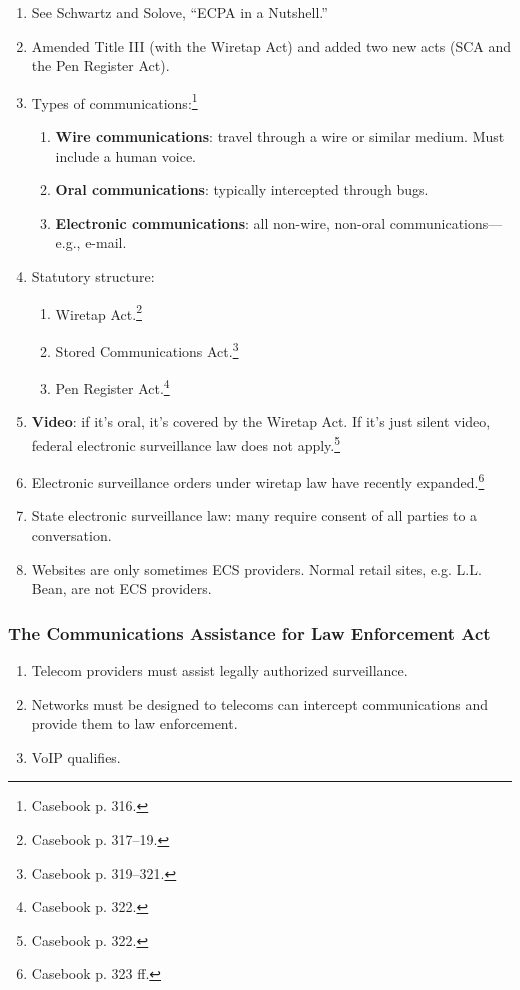 \begin{enumerate}
    \item See Schwartz and Solove, ``ECPA in a Nutshell.''
    \item Amended Title III (with the Wiretap Act) and added two new acts (SCA 
    and the Pen Register Act).
    \item Types of communications:\footnote{Casebook p. 316.}
    \begin{enumerate}
        \item \textbf{Wire communications}: travel through a wire or similar 
        medium. Must include a human voice.
        \item \textbf{Oral communications}: typically intercepted through 
        bugs.
        \item \textbf{Electronic communications}: all non-wire, non-oral 
        communications---e.g., e-mail. 
    \end{enumerate}
    \item Statutory structure:
    \begin{enumerate}
        \item Wiretap Act.\footnote{Casebook p. 317--19.}
        \item Stored Communications Act.\footnote{Casebook p. 319--321.}
        \item Pen Register Act.\footnote{Casebook p. 322.}
    \end{enumerate}
    \item \textbf{Video}: if it's oral, it's covered by the Wiretap Act. If 
    it's just silent video, federal electronic surveillance law does not 
    apply.\footnote{Casebook p. 322.}
    \item Electronic surveillance orders under wiretap law have recently 
    expanded.\footnote{Casebook p. 323 ff.}
    \item State electronic surveillance law: many require consent of all 
    parties to a conversation.
    \item Websites are only sometimes ECS providers. Normal retail sites, e.g. 
    L.L. Bean, are not ECS providers.
\end{enumerate}

\subsubsection{The Communications Assistance for Law Enforcement Act}

\begin{enumerate}
    \item Telecom providers must assist legally authorized surveillance.
    \item Networks must be designed to telecoms can intercept communications 
    and provide them to law enforcement.
    \item VoIP qualifies.
\end{enumerate}

